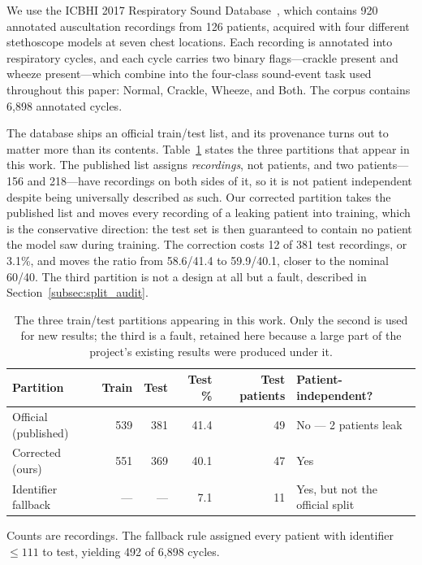\documentclass[journal,onecolumn]{IEEEtran}
\begin{document}
We use the ICBHI 2017 Respiratory Sound Database~\cite{rocha2019icbhi}, which
contains 920 annotated auscultation recordings from 126 patients, acquired with four
different stethoscope models at seven chest locations. Each recording is annotated
into respiratory cycles, and each cycle carries two binary flags---crackle present
and wheeze present---which combine into the four-class sound-event task used
throughout this paper: Normal, Crackle, Wheeze, and Both. The corpus contains 6{,}898
annotated cycles.

The database ships an official train/test list, and its provenance turns out to
matter more than its contents. Table~\ref{tab:splits} states the three partitions
that appear in this work. The published list assigns \emph{recordings}, not patients,
and two patients---156 and 218---have recordings on both sides of it, so it is not
patient independent despite being universally described as such. Our corrected
partition takes the published list and moves every recording of a leaking patient
into training, which is the conservative direction: the test set is then guaranteed
to contain no patient the model saw during training. The correction costs 12 of 381
test recordings, or 3.1\%, and moves the ratio from 58.6/41.4 to 59.9/40.1, closer to
the nominal 60/40. The third partition is not a design at all but a fault, described
in Section~\ref{subsec:split_audit}.

\begin{table}[!t]
\centering
\caption{The three train/test partitions appearing in this work. Only the second is
used for new results; the third is a fault, retained here because a large part of the
project's existing results were produced under it.}
\label{tab:splits}
\begin{tabular}{lrrrrl}
\toprule
Partition & Train & Test & Test \% & Test patients & Patient-independent? \\
\midrule
Official (published) & 539 & 381 & 41.4 & 49 & No --- 2 patients leak \\
Corrected (ours) & 551 & 369 & 40.1 & 47 & Yes \\
Identifier fallback & --- & --- & 7.1 & 11 & Yes, but not the official split \\
\bottomrule
\end{tabular}

\vspace{2pt}
\footnotesize Counts are recordings. The fallback rule assigned every patient with
identifier $\leq 111$ to test, yielding 492 of 6{,}898 cycles.
\end{table}
\end{document}
